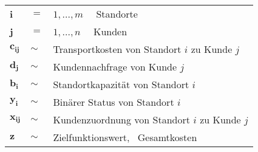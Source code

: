 \renewcommand\baselinestretch{1.25}\selectfont

\begin{table}[h]
\begin{tabular}{lll}
\bigskip
\textbf{i}   &  $=$  & $ 1,...,m$ \ \ Standorte \\ \bigskip
\textbf{j}      &  $=$ & $ 1,...,n$ \ \ Kunden            \\\bigskip
$\mathbf{c_{ij}}$  & $\sim$ & Transportkosten von Standort $i$  zu Kunde $j$        \\\bigskip
$\mathbf{d_j}$    & $\sim$ & Kundennachfrage von Kunde $j$              \\\bigskip
$\mathbf{b_i}$    & $\sim$ & Standortkapazität von Standort $i$          \\\bigskip
$\mathbf{y_i}$    & $\sim$ & Binärer Status von Standort $i$            \\\bigskip
$\mathbf{x_{ij}}$ & $\sim$ & Kundenzuordnung von Standort $i$ zu Kunde $j$   \\\bigskip    
$\mathbf{z}$  & $\sim$ & Zielfunktionswert, \ Gesamtkosten 
\end{tabular}
\end{table}

\renewcommand\baselinestretch{1}\selectfont
